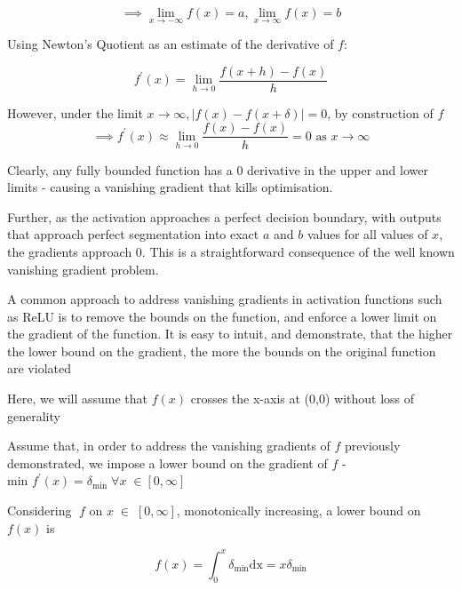 \documentclass[9pt,conference]{IEEEtran}
\begin{document}
\begin{equation*}
 \implies \lim\limits_{x\to -\infty} f\left(x\right) = a, \lim\limits_{x\to \infty} f\left(x\right) = b 
\end{equation*}

Using Newton's Quotient as an estimate of the derivative of $f$:

\begin{equation*}
f^\prime\left(x\right) = \lim\limits_{h\to 0}\frac{f\left(x+h\right)-f\left(x\right)}{h}
\end{equation*}

However, under the limit $x \to \infty, \left|f\left(x\right)-f\left(x+\delta\right)\right|=0$, by construction of $f$
\begin{equation*}
    \implies f^\prime\left(x\right) \approx \lim\limits_{h\to 0}\frac{f\left(x\right)-f\left(x\right)}{h} = 0 \text{ as }  x\to \infty
\end{equation*}

Clearly, any fully bounded function has a 0 derivative in the upper and lower limits - causing a vanishing gradient that kills optimisation.

Further, as the activation approaches a perfect decision boundary, with outputs that approach perfect segmentation into exact $a$ and $b$ values for all values of $x$, the gradients approach 0. This is a straightforward consequence of the well known vanishing gradient problem.

A common approach to address vanishing gradients in activation functions such as ReLU is to remove the bounds on the function, and enforce a lower limit on the gradient of the function. It is easy to intuit, and demonstrate, that the higher the lower bound on the gradient, the more the bounds on the original function are violated

Here, we will assume that $f\left(x\right)$ crosses the x-axis at (0,0) without loss of generality

Assume that, in order to address the vanishing gradients of $f$ previously demonstrated, we impose a lower bound on the gradient of $f$ - $\text{min } f^\prime\left(x\right)=\delta_\text{min} \; \forall x\; \in\left[0,\infty\right]$

Considering  $\;f$ on $x\;\in\;\left[0,\infty\right]$, monotonically increasing, a lower bound on $f\left(x\right)$ is 

\begin{equation*}
f\left(x\right)=\int_0^x\delta_{\text{min}}\text{dx}=x\delta_{\text{min}}
\end{equation*}
\end{document}
